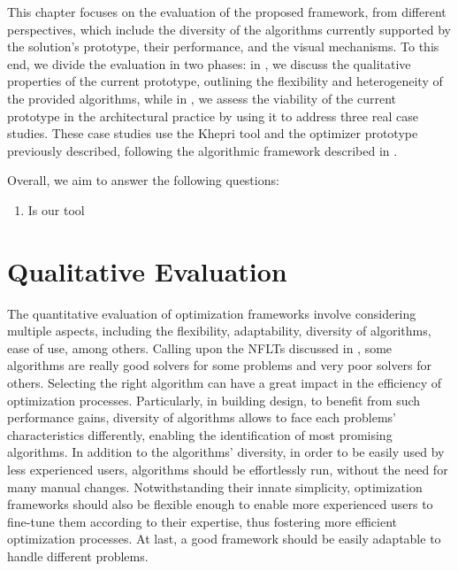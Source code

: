 \cleardoublepage
\label{chap:evaluation}
 
This chapter focuses on the evaluation of the proposed framework, from different perspectives, which include the diversity of the algorithms currently supported by the solution's prototype, their performance, and the visual mechanisms. To this end, we divide the evaluation in two phases: in , we discuss the qualitative properties of the current prototype, outlining the flexibility and heterogeneity of the provided algorithms, while in , we assess the viability of the current prototype in the architectural practice by using it to address three real case studies. These case studies use the Khepri tool and the optimizer prototype previously described, following the algorithmic framework described in .

Overall, we aim to answer the following questions:
\begin{enumerate}
	\item Is our tool 
\end{enumerate}

\section{Qualitative Evaluation}
\label{sec:qualitative}

The quantitative evaluation of optimization frameworks involve considering multiple aspects, including the flexibility, adaptability, diversity of algorithms, ease of use, among others. Calling upon the \acp{NFLT} discussed in , some algorithms are really good solvers for some problems and very poor solvers for others. Selecting the right algorithm can have a great impact in the efficiency of optimization processes. Particularly, in building design, to benefit from such performance gains, diversity of algorithms allows to face each problems' characteristics differently, enabling the identification of most promising algorithms. In addition to the algorithms' diversity, in order to be easily used by less experienced users, algorithms should be effortlessly run, without the need for many manual changes. Notwithstanding their innate simplicity, optimization frameworks should also be flexible enough to enable more experienced users to fine-tune them according to their expertise, thus fostering more efficient optimization processes. At last, a good framework should be easily adaptable to handle different problems.

